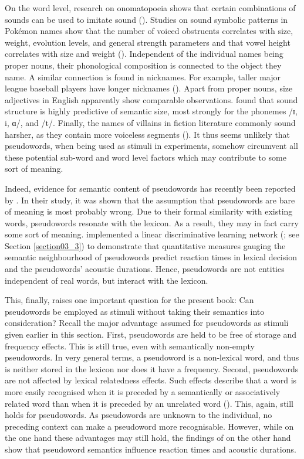On the word level, research on onomatopoeia shows that certain combinations of sounds can be used to imitate sound (\cite{Pratha2016}). Studies on sound symbolic patterns in Pokémon names show that the number of voiced obstruents correlates with size, weight, evolution levels, and general strength parameters and that vowel height correlates with size and weight (\cite{Kawahara2018}). Independent of the individual names being proper nouns, their phonological composition is connected to the object they name. A similar connection is found in nicknames. For example, taller major league baseball players have longer nicknames (\cite{Shih2020}). Apart from proper nouns, size adjectives in English apparently show comparable observations. \citet{Winter2021} found that sound structure is highly predictive of semantic size, most strongly for the phonemes /ɪ, i, ɑ/, and /t/. Finally, the names of villains in fiction literature commonly sound harsher, as they contain more voiceless segments (\cite{Elsen2008}). It thus seems unlikely that pseudowords, when being used as stimuli in experiments, somehow circumvent all these potential sub-word and word level factors which may contribute to some sort of meaning.

Indeed, evidence for semantic content of pseudowords has recently been reported by \citet{Chuang2021}. In their study, it was shown that the assumption that pseudowords are bare of meaning is most probably wrong. Due to their formal similarity with existing words, pseudowords resonate with the lexicon. As a result, they may in fact carry some sort of meaning. \citet{Chuang2021} implemented a linear discriminative learning network (\cite{Baayen2019}; see Section \ref{section03_3}) to demonstrate that quantitative measures gauging the semantic neighbourhood of pseudowords predict reaction times in lexical decision and the pseudowords’ acoustic durations. Hence, pseudowords are not entities independent of real words, but interact with the lexicon.

This, finally, raises one important question for the present book: Can pseudowords be employed as stimuli without taking their semantics into consideration? Recall the major advantage assumed for pseudowords as stimuli given earlier in this section. First, pseudowords are held to be free of storage and frequency effects. This is still true, even with semantically non-empty pseudowords. In very general terms, a pseudoword is a non-lexical word, and thus is neither stored in the lexicon nor does it have a frequency. Second, pseudowords are not affected by lexical relatedness effects. Such effects describe that a word is more easily recognised when it is preceded by a semantically or associatively related word than when it is preceded by an unrelated word (\cite{Schriefers1998}). This, again, still holds for pseudowords. As pseudowords are unknown to the individual, no preceding context can make a pseudoword more recognisable. However, while on the one hand these advantages may still hold, the findings of \citet{Chuang2021} on the other hand show that pseudoword semantics influence reaction times and acoustic durations.


